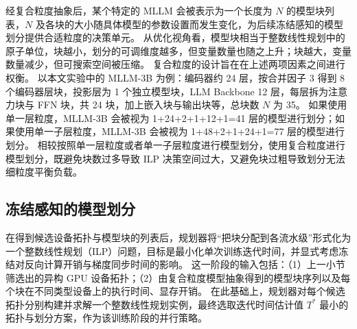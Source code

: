 经复合粒度抽象后，某个特定的 MLLM 会被表示为一个长度为 $N$ 的模型块列表，$N$ 及各块的大小随具体模型的参数设置而发生变化，为后续冻结感知的模型划分提供合适粒度的决策单元。
从优化视角看，模型块相当于整数线性规划中的原子单位，块越小，划分的可调维度越多，但变量数量也随之上升；块越大，变量数量减少，但可搜索空间被压缩。
复合粒度的设计旨在在上述两项因素之间进行权衡。
以本文实验中的 MLLM-3B 为例：编码器约 24 层，按合并因子 3 得到 8 个编码器层块，投影层为 1 个独立模型块，LLM Backbone 12 层，每层拆为注意力块与 FFN 块，共 24 块，加上嵌入块与输出块等，总块数 $N$ 为 35。
如果使用单一层粒度，MLLM-3B 会被视为 1+24+2+1+12+1=41 层的模型进行划分；如果使用单一子层粒度，MLLM-3B 会被视为 1+48+2+1+24+1=77 层的模型进行划分。
相较按照单一层粒度或者单一子层粒度进行模型划分，使用复合粒度进行模型划分，既避免块数过多导致 ILP 决策空间过大，又避免块过粗导致划分无法细粒度平衡负载。

\subsection{冻结感知的模型划分}

在得到候选设备拓扑与模型块的列表后，规划器将“把块分配到各流水级”形式化为一个整数线性规划（ILP）问题，目标是最小化单次训练迭代时间，并显式考虑冻结对反向计算开销与梯度同步时间的影响。
这一阶段的输入包括：（1）上一小节筛选出的异构 GPU 设备拓扑；（2）由复合粒度模型抽象得到的模型块序列以及每个块在不同类型设备上的执行时间、显存开销。
在此基础上，规划器对每个候选拓扑分别构建并求解一个整数线性规划实例，最终选取迭代时间估计值 $T^*$ 最小的拓扑与划分方案，作为该训练阶段的并行策略。

